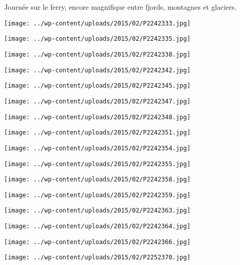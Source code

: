\pagebreak
 Journée sur le ferry, encore magnifique entre fjords, montagnes et glaciers.
\begin{center} \texttt{[image: ../wp-content/uploads/2015/02/P2242333.jpg]} \end{center}
\begin{center} \texttt{[image: ../wp-content/uploads/2015/02/P2242335.jpg]} \end{center}
\begin{center} \texttt{[image: ../wp-content/uploads/2015/02/P2242338.jpg]} \end{center}
\begin{center} \texttt{[image: ../wp-content/uploads/2015/02/P2242342.jpg]} \end{center}
\begin{center} \texttt{[image: ../wp-content/uploads/2015/02/P2242345.jpg]} \end{center}
\begin{center} \texttt{[image: ../wp-content/uploads/2015/02/P2242347.jpg]} \end{center}
\begin{center} \texttt{[image: ../wp-content/uploads/2015/02/P2242348.jpg]} \end{center}
\begin{center} \texttt{[image: ../wp-content/uploads/2015/02/P2242351.jpg]} \end{center}
\begin{center} \texttt{[image: ../wp-content/uploads/2015/02/P2242354.jpg]} \end{center}
\begin{center} \texttt{[image: ../wp-content/uploads/2015/02/P2242355.jpg]} \end{center}
\begin{center} \texttt{[image: ../wp-content/uploads/2015/02/P2242358.jpg]} \end{center}
\begin{center} \texttt{[image: ../wp-content/uploads/2015/02/P2242359.jpg]} \end{center}
\begin{center} \texttt{[image: ../wp-content/uploads/2015/02/P2242363.jpg]} \end{center}
\begin{center} \texttt{[image: ../wp-content/uploads/2015/02/P2242364.jpg]} \end{center}
\begin{center} \texttt{[image: ../wp-content/uploads/2015/02/P2242366.jpg]} \end{center}
\begin{center} \texttt{[image: ../wp-content/uploads/2015/02/P2252370.jpg]} \end{center}

